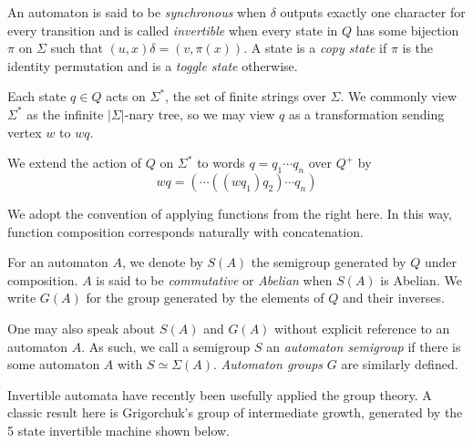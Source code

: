 \documentclass[10pt]{article} %
\newcommand{\defn}[1]{\textit{#1}}
\begin{document}
    An automaton is said to be \defn{synchronous} when $\delta$ outputs exactly one character for every transition and is called \defn{invertible} when every state in $Q$ has some bijection $\pi$ on $\Sigma$ such that $(u, x)\delta = (v, \pi(x))$. A state is a \defn{copy state} if $\pi$ is the identity permutation and is a \defn{toggle state} otherwise.

    Each state $q \in Q$ acts on $\Sigma^*$, the set of finite strings over $\Sigma$. We commonly view $\Sigma^*$ as the infinite $|\Sigma|$-nary tree, so we may view $q$ as a transformation sending vertex $w$ to $wq$.

    We extend the action of $Q$ on $\Sigma^*$ to words $q = q_1\cdots q_n$ over $Q^+$ by \[ wq = (\cdots((w q_1) q_2)\cdots q_n) \]

    We adopt the convention of applying functions from the right here. In this way, function composition corresponds naturally with concatenation.

    For an automaton $A$, we denote by $S(A)$ the semigroup generated by $Q$ under composition. $A$ is said to be \defn{commutative} or \defn{Abelian} when $S(A)$ is Abelian. We write $G(A)$ for the group generated by the elements of $Q$ and their inverses.

    One may also speak about $S(A)$ and $G(A)$ without explicit reference to an automaton $A$. As such, we call a semigroup $S$ an \defn{automaton semigroup} if there is some automaton $A$ with $S \simeq \Sigma(A)$. \defn{Automaton groups} $G$ are similarly defined.

    Invertible automata have recently been usefully applied the group theory. A classic result here is Grigorchuk's group of intermediate growth, generated by the 5 state invertible machine shown below.
    
    \begin{center}
    \end{center}
\end{document}
